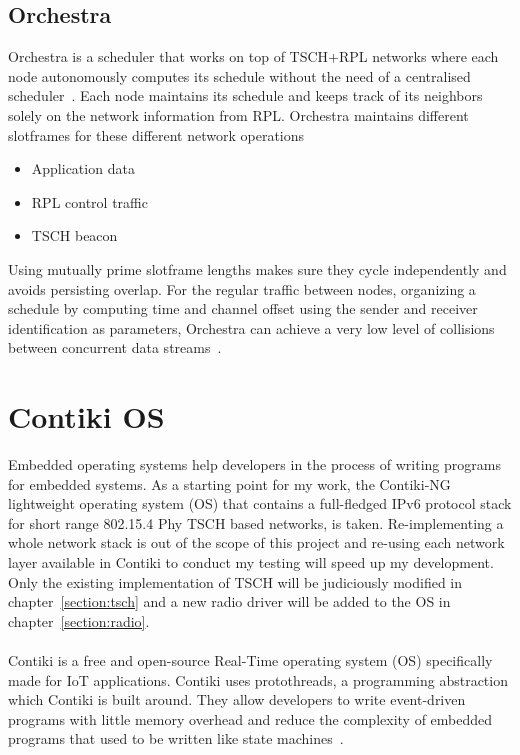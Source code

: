 \subsection{Orchestra}

Orchestra is a scheduler that works on top of TSCH+RPL
networks where each node autonomously computes its schedule without the
need of a centralised scheduler~\cite{duquennoy2015}.
Each node maintains its schedule and keeps track of its neighbors solely
on the network information from RPL.
Orchestra maintains different slotframes for these different network operations

\begin{itemize}
  \item Application data
  \item RPL control traffic
  \item TSCH beacon
\end{itemize}

Using mutually prime slotframe lengths
makes sure they cycle independently and avoids persisting overlap.
For the regular traffic between nodes, organizing a schedule by computing time
and channel offset using the sender and receiver
identification as parameters, Orchestra can achieve a very low level of
collisions between concurrent data streams~\cite{duquennoy2015}.

\section{Contiki OS}

Embedded operating systems help developers in the process of writing programs
for embedded systems.
As a starting point for my work, the Contiki-NG lightweight operating system (OS)
that contains a full-fledged IPv6 protocol stack for short range 802.15.4 Phy
TSCH based networks, is taken.
Re-implementing a whole network stack is out of the scope of this project and
re-using each network layer available in Contiki to conduct my testing will
speed up my development.
Only the existing implementation of TSCH will be judiciously modified in
chapter~\ref{section:tsch} and a new radio driver will be added to
the OS in chapter~\ref{section:radio}.

\paragraph{}

Contiki is a free and open-source Real-Time operating system (OS) specifically made
for IoT applications.
Contiki uses protothreads, a programming abstraction which Contiki is
built around.
They allow developers to write event-driven programs with little memory overhead and
reduce the complexity of embedded programs that used to be written
like state machines~\cite{10.1145/1182807.1182811}.

